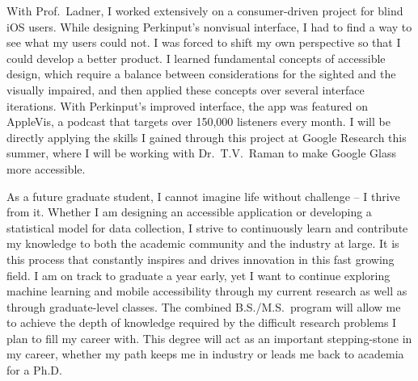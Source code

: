 With Prof.\ Ladner, I worked extensively on a consumer-driven project for blind iOS users. While designing Perkinput's nonvisual interface, I had to find a way to see what my users could not. I was forced to shift my own perspective so that I could develop a better product. I learned fundamental concepts of accessible design, which require a balance between considerations for the sighted and the visually impaired, and then applied these concepts over several interface iterations. With Perkinput's improved interface, the app was featured on AppleVis, a podcast that targets over 150,000 listeners every month. I will be directly applying the skills I gained through this project at Google Research this summer, where I will be working with Dr.\ T.V.\ Raman to make Google Glass more accessible.\vspace{2 mm}

As a future graduate student, I cannot imagine life without challenge -- I thrive from it. Whether I am designing an accessible application or developing a statistical model for data collection, I strive to continuously learn and contribute my knowledge to both the academic community and the industry at large. It is this process that constantly inspires and drives innovation in this fast growing field. I am on track to graduate a year early, yet I want to continue exploring machine learning and mobile accessibility through my current research as well as through graduate-level classes. The combined B.S./M.S.\ program will allow me to achieve the depth of knowledge required by the difficult research problems I plan to fill my career with. This degree will act as an important stepping-stone in my career, whether my path keeps me in industry or leads me back to academia for a Ph.D.\

